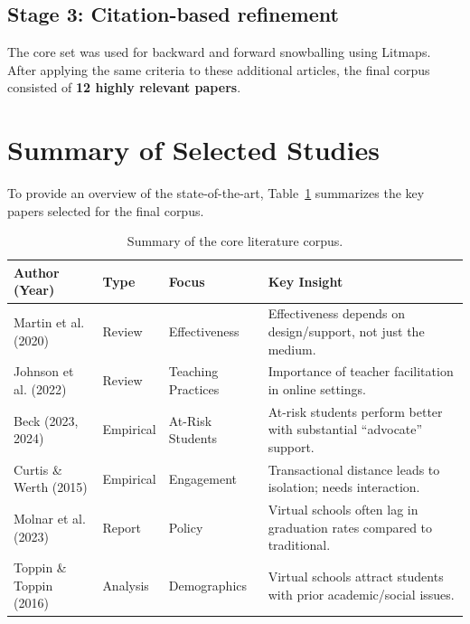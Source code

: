 \subsection{Stage 3: Citation-based refinement}
The core set was used for backward and forward snowballing using Litmaps. After applying the same criteria to these additional articles, the final corpus consisted of \textbf{12 highly relevant papers}.

\section{Summary of Selected Studies}
To provide an overview of the state-of-the-art, Table~\ref{tab:lit_summary} summarizes the key papers selected for the final corpus.

\begin{table}[ht]
\centering
\scriptsize
\begin{tabular}{|p{3cm}|p{2cm}|p{3cm}|p{5cm}|}
\hline
\textbf{Author (Year)} & \textbf{Type} & \textbf{Focus} & \textbf{Key Insight} \\ \hline
Martin et al. (2020) & Review & Effectiveness & Effectiveness depends on design/support, not just the medium. \\ \hline
Johnson et al. (2022) & Review & Teaching Practices & Importance of teacher facilitation in online settings. \\ \hline
Beck (2023, 2024) & Empirical & At-Risk Students & At-risk students perform better with substantial ``advocate'' support. \\ \hline
Curtis \& Werth (2015) & Empirical & Engagement & Transactional distance leads to isolation; needs interaction. \\ \hline
Molnar et al. (2023) & Report & Policy & Virtual schools often lag in graduation rates compared to traditional. \\ \hline
Toppin \& Toppin (2016) & Analysis & Demographics & Virtual schools attract students with prior academic/social issues. \\ \hline
\end{tabular}
\caption{Summary of the core literature corpus.}
\label{tab:lit_summary}
\end{table}



